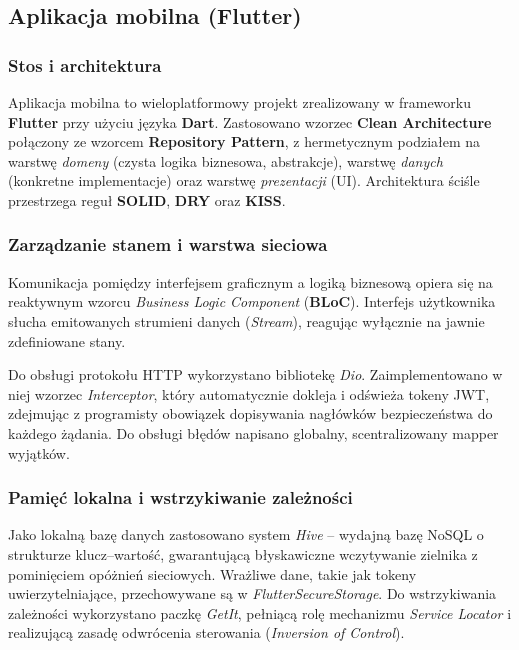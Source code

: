 \documentclass[12pt,a4paper]{article}
\begin{document}
\subsection{Aplikacja mobilna (Flutter)}

\subsubsection{Stos i architektura}

Aplikacja mobilna to wieloplatformowy projekt zrealizowany w frameworku \textbf{Flutter} przy u\.zyciu j\k{e}zyka \textbf{Dart}. Zastosowano wzorzec \textbf{Clean Architecture} po\l{}\k{a}czony ze wzorcem \textbf{Repository Pattern}, z hermetycznym podzia\l{}em na warstw\k{e} \textit{domeny} (czysta logika biznesowa, abstrakcje), warstw\k{e} \textit{danych} (konkretne implementacje) oraz warstw\k{e} \textit{prezentacji} (UI). Architektura \'sci\'sle przestrzega regu\l{} \textbf{SOLID}, \textbf{DRY} oraz \textbf{KISS}.

\subsubsection{Zarz\k{a}dzanie stanem i warstwa sieciowa}

Komunikacja pomi\k{e}dzy interfejsem graficznym a logik\k{a} biznesow\k{a} opiera si\k{e} na reaktywnym wzorcu \textit{Business Logic Component} (\textbf{BLoC}). Interfejs u\.zytkownika s\l{}ucha emitowanych strumieni danych (\textit{Stream}), reaguj\k{a}c wy\l{}\k{a}cznie na jawnie zdefiniowane stany.

Do obs\l{}ugi protoko\l{}u HTTP wykorzystano bibliotek\k{e} \textit{Dio}. Zaimplementowano w niej wzorzec \textit{Interceptor}, kt\'ory automatycznie dokleja i od\'swie\.za tokeny JWT, zdejmuj\k{a}c z programisty obowi\k{a}zek dopisywania nag\l{}\'owk\'ow bezpiecze\'nstwa do ka\.zdego \.z\k{a}dania. Do obs\l{}ugi b\l{}\k{e}d\'ow napisano globalny, scentralizowany mapper wyj\k{a}tk\'ow.

\subsubsection{Pami\k{e}\'c lokalna i wstrzykiwanie zale\.zno\'sci}

Jako lokaln\k{a} baz\k{e} danych zastosowano system \textit{Hive} -- wydajn\k{a} baz\k{e} NoSQL o strukturze klucz--warto\'s\'c, gwarantuj\k{a}c\k{a} b\l{}yskawiczne wczytywanie zielnika z pomini\k{e}ciem op\'o\.znie\'n sieciowych. Wra\.zliwe dane, takie jak tokeny uwierzytelniaj\k{a}ce, przechowywane s\k{a} w \textit{FlutterSecureStorage}. Do wstrzykiwania zale\.zno\'sci wykorzystano paczk\k{e} \textit{GetIt}, pe\l{}ni\k{a}c\k{a} rol\k{e} mechanizmu \textit{Service Locator} i realizuj\k{a}c\k{a} zasad\k{e} odwr\'ocenia sterowania (\textit{Inversion of Control}).
\end{document}

